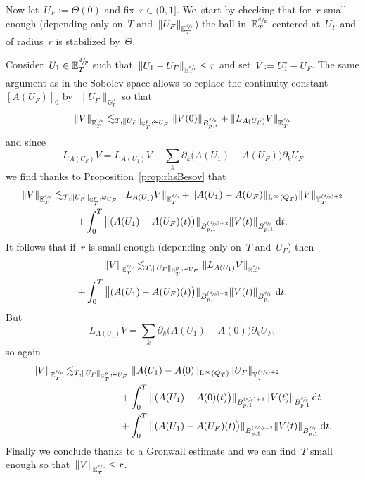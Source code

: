 \documentclass[10pt]{amsart}
\newcommand{\Psfrac}[2]{(\sfrac{#1}{#2})}
\theoremstyle{definition}
\newcommand\dd{\mathrm{d}}
\renewcommand\L{\mathrm{L}}
\begin{document}
Now let~$U_F:= \Theta(0)$ and fix~$r \in (0,1]$. We~start by checking that for~$r$ small enough (depending only on~$T$ and~$\|U_F\|_{{\mathbb E}^{\sfrac dp}_T}$) the ball in~${\mathbb E}^{\sfrac dp}_T$ centered at~$U_F$ and of radius~$r$ is stabilized by~$\Theta$.

Consider~$U_1 \in {\mathbb E}^{\sfrac dp}_T$ such that~$\|U_1-U_F\|_{ {\mathbb E}^{\sfrac dp}_T} \leq r$ and set~$V:=U_1^\star - U_F$. The same argument as in the Sobolev space allows to replace the continuity constant~$[A(U_F)]_0$ by~$\|U_F\|_{\mathbb G^p_T}$ so that
\[
\|V\|_{{\mathbb E}^{\sfrac dp}_T} \lesssim_{T,\|U_F\|_{\mathbb G^p_T},\omega_{U_F} } \| V (0)\|_{B^{\sfrac dp}_{p,1}} + \|L_{A(U_F)}V\|_{\mathbb E_T^{\sfrac dp}}
\]
and since
\[
L_{A(U_F)} V = L_{A(U_1)} V + \sum_k \partial_k \bigl(A(U_1) - A(U_F)\bigr)\partial_kU_F
\]
we find thanks to Proposition~\ref{prop:rhsBesov} that
\begin{multline*}
\|V\|_{{\mathbb E}^{\sfrac dp}_T}\lesssim_{T,\|U_F\|_{\mathbb G^p_T},\omega_{U_F}} \|L_{A(U_1)}V\|_{\mathbb E_T^{\sfrac dp}} + \|A(U_1)- A(U_F)\|_{\L^\infty(Q_T)} \|V\|_{{\mathbb Y}^{\Psfrac dp+2}_T} \\
+ \int_0^T
\big \|(A(U_1)- A(U_F)(t)\bigr)\|_{B_{p,1}^{\Psfrac dp+2}} \| V (t)\|_{B^{\sfrac dp}_{p,1}} \, \dd t.
\end{multline*}
It follows that if~$r$ is small enough (depending only on~$T$ and~$ U_F $) then
\begin{multline*}
\|V\|_{{\mathbb E}^{\sfrac dp}_T} \lesssim_{T, \|U_F\|_{\mathbb G^p_T},\omega_{U_F} } \|L_{A(U_1)}V\|_{\mathbb E_T^{\sfrac dp}}\\
+ \int_0^T
\big \|(A(U_1)- A(U_F)(t)\bigr)\|_{B_{p,1}^{\Psfrac dp+2}} \| V (t)\|_{B^{\sfrac dp}_{p,1}} \, \dd t.
\end{multline*}
But
\[
L_{A(U_1)} V = \sum_k \partial_k \bigl(A(U_1) - A(0)\bigr)\partial_kU_F,
\]
so again
\[
\begin{aligned}
\|V\|_{{\mathbb E}^{\sfrac dp}_T} & \lesssim_{T, \|U_F\|_{\mathbb G^p_T},\omega_{U_F}} \|A(U_1)- A(0)\|_{\L^\infty(Q_T)} \|U_F\|_{\mathbb Y_T^{\Psfrac dp+2}} \\
&\hspace*{2cm}+ \int_0^T
\big \|(A(U_1)- A(0)(t)\bigr)\|_{B_{p,1}^{\Psfrac dp+2}} \| V (t)\|_{B^{\sfrac dp}_{p,1}} \, \dd t\\
&\hspace*{2cm}+ \int_0^T
\big \|(A(U_1)- A(U_F)(t)\bigr)\|_{B_{p,1}^{\Psfrac dp+2}} \| V (t)\|_{B^{\sfrac dp}_{p,1}} \, \dd t.
\end{aligned}
\]
Finally we conclude thanks to a Gronwall estimate and we can find~$T$ small enough so that~$ \|V\|_{{\mathbb E}^{\sfrac dp}_T} \leq r$.
\end{document}
